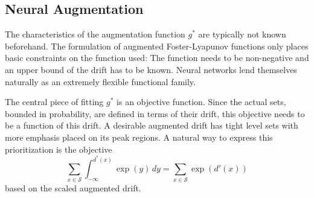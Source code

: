 \subsection{Neural Augmentation}
The characteristics of the augmentation function $g^*$ are typically not known beforehand.
The formulation of augmented Foster-Lyapunov functions only places basic constraints on the function used:
The function needs to be non-negative and an upper bound of the drift has to be known.
Neural networks lend themselves naturally as an extremely flexible functional family.

The central piece of fitting $g^*$ is an objective function.
Since the actual sets, bounded in probability, are defined in terms of their drift, this objective needs to be a function of this drift.
A desirable augmented drift has tight level sets with more emphasis placed on its peak regions.
A natural way to express this prioritization is the objective
\[\sum_{x\in\mathcal{S}}\int_{-\infty}^{d^*(x)}\exp(y)\,dy = \sum_{x\in\mathcal{S}} \exp(d'(x)) \]
based on the scaled augmented drift.


